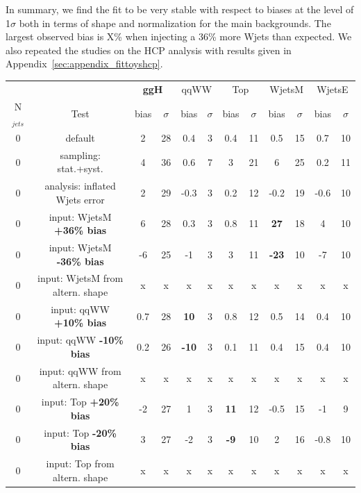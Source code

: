 In summary, we find the fit to be very stable with respect to biases at the level of 1$\sigma$ both in terms of shape and 
normalization for the main backgrounds. The largest observed bias is X\% when injecting a 36\% more Wjets than expected.
We also repeated the studies on the HCP analysis with results given in Appendix~\ref{sec:appendix_fittoyshcp}. 

\begin{table}
\begin{center}
\begin{tabular}{c | c  | c c | c c | c c | c c | c c }
\hline
          &      & \multicolumn{2}{c|}{{\bf ggH}} & \multicolumn{2}{c|}{qqWW} & \multicolumn{2}{c|}{Top} & \multicolumn{2}{c}{WjetsM} & \multicolumn{2}{c}{WjetsE} \\ 
N$_{jets}$ & Test & bias & $\sigma$ & bias & $\sigma$ & bias & $\sigma$ & bias & $\sigma$ & bias & $\sigma$ \\
\hline
0 & default                             &  2  & 28 & 0.4 & 3 & 0.4 & 11 & 0.5 & 15 & 0.7 & 10  \\
0 & sampling: stat.+syst.               &  4  & 36 & 0.6 & 7 &  3  & 21 &  6  & 25 & 0.2 & 11 \\
\hline
0 & analysis: inflated Wjets error      &  2   & 29 & -0.3  & 3 & 0.2  & 12  & -0.2   & 19  & -0.6  & 10\\
0 & input: WjetsM {\bf +36\% bias}      & 6   & 28 & 0.3 & 3 & 0.8 & 11 & {\bf 27}  & 18 & 4  & 10  \\
0 & input: WjetsM {\bf -36\% bias}      & -6  & 25  & -1 & 3 & 3   & 11 & {\bf -23} & 10 & -7  & 10\\
0 & input: WjetsM from altern. shape    & x   & x  & x   & x & x   & x  & x   & x  & x   & x\\
\hline
0 & input: qqWW {\bf +10\% bias}        & 0.7 & 28 & {\bf 10}  & 3 & 0.8 & 12 & 0.5 & 14 & 0.4 & 10  \\
0 & input: qqWW {\bf -10\% bias}        & 0.2 & 26 & {\bf -10} & 3 & 0.1 & 11 & 0.4 & 15 & 0.4 & 10 \\
0 & input: qqWW from altern. shape      & x   & x  & x   & x & x   & x  & x   & x  & x   & x\\
\hline
0 & input: Top {\bf +20\% bias}         & -2  & 27  & 1   & 3 & {\bf 11} & 12  & -0.5 & 15  & -1   & 9\\
0 & input: Top {\bf -20\% bias}         & 3   & 27  & -2  & 3 & {\bf -9} & 10  & 2    & 16  & -0.8 & 10\\
0 & input: Top from altern. shape       & x   & x  & x    & x & x   & x  & x   & x  & x   & x\\

\end{tabular}
\end{center}
\end{table}

